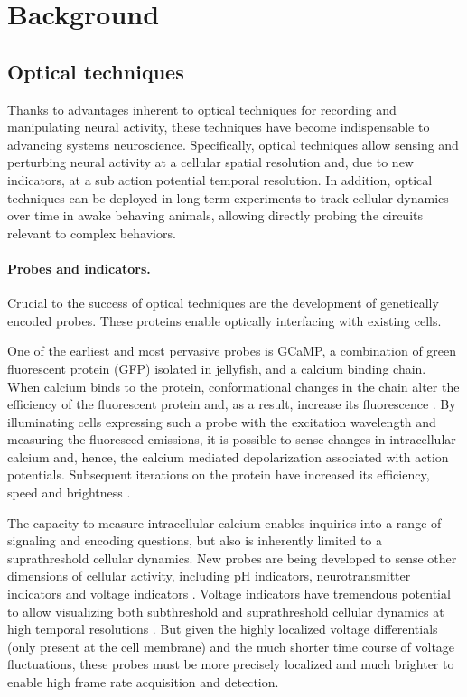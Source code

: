 \section{Background}

\subsection{Optical techniques}

Thanks to advantages inherent to optical techniques for 
recording and manipulating neural activity, these techniques 
have become indispensable to advancing systems neuroscience. 
Specifically, optical techniques allow sensing and perturbing 
neural activity at a cellular spatial resolution and, due
to new indicators, at a sub action potential temporal 
resolution. In addition, optical techniques can be deployed 
in long-term experiments to track cellular dynamics over time 
in awake behaving animals, allowing directly probing the 
circuits relevant to complex behaviors.

\paragraph{Probes and indicators.} Crucial to the success of 
optical techniques are the development of genetically encoded 
probes. These proteins enable optically interfacing with 
existing cells. 

One of the earliest and most pervasive probes is GCaMP, a
combination of green fluorescent protein (GFP) isolated in 
jellyfish, and a calcium binding chain. When calcium 
binds to the protein, conformational changes in the chain 
alter the efficiency of the fluorescent protein and, 
as a result, increase its fluorescence
\cite{Nakai:2001fy,Barnett:2017kn}. By illuminating cells expressing such a
probe with the excitation wavelength and measuring the 
fluoresced emissions, it is possible to sense changes in
intracellular calcium and, hence, the calcium mediated 
depolarization associated with action potentials. Subsequent 
iterations on the protein have increased its efficiency, 
speed and brightness \cite{Chen:2013fc}.

The capacity to measure intracellular calcium enables 
inquiries into a range of signaling and encoding questions, 
but also is inherently limited to a suprathreshold cellular 
dynamics. New probes are being developed to sense other 
dimensions of cellular activity, including pH indicators, 
neurotransmitter indicators and voltage indicators 
\cite{Lin:2016id}. Voltage indicators have tremendous 
potential to allow visualizing both subthreshold and 
suprathreshold cellular dynamics at high temporal resolutions 
\cite{Han:2013iz,StPierre:2014db,Gong:2015is}. But given 
the highly localized voltage differentials (only present 
at the cell membrane) and the much shorter time course of 
voltage fluctuations, these probes must be more precisely
localized and much brighter to enable high frame rate 
acquisition and detection.

